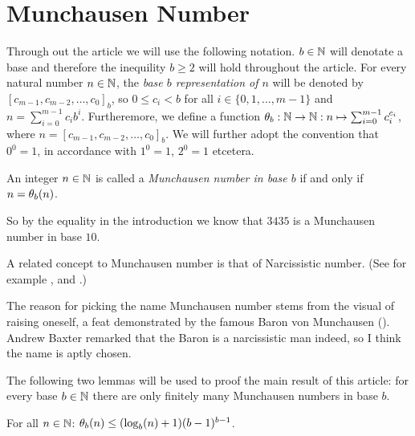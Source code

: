 \section*{Munchausen Number}
Through out the article we will use the following notation. $b \in \N$ will 
denotate a base and therefore the inequility $b \ge 2$ will hold throughout the
article. For every natural number $n \in \N$, the \emph{base $b$ representation
of $n$} will be denoted by $[c_{m-1}, c_{m-2}, \ldots, c_{0}]_{b}$, 
so $0 \le c_{i} < b$ for all $i \in \{0,1,\ldots,m-1\}$ and 
$n = \sum_{i=0}^{m-1} c_{i}b^{i}$.
Furtheremore, we define a function $\P_{b} : \N \rightarrow \N : n \mapsto 
\sum_{i=0}^{m-1} c_{i}^{c_{i}}$, where $n = [c_{m-1},c_{m-2},\ldots,c_{0}]_{b}$.
We will further adopt the convention that $0^{0} = 1$, in accordance with 
$1^{0} = 1$, $2^{0} = 1$ etcetera.

\begin{definition}
	An integer $n \in \N$ is called a \emph{Munchausen number in base $b$} if 
	and only if $n = \P_{b}(n)$.
\end{definition}

So by the equality in the introduction we know that $3435$ is a Munchausen
number in base $10$. 

\begin{remark}
	A related concept to Munchausen number is that of Narcissistic number. 
	(See for example \cite{pickover}, \cite{wikipedia:narcissistic_number} and
	\cite{wolfram:narcissistic_number}.)
	
	The reason for picking the name Munchausen number stems from the visual of
	raising oneself, a feat demonstrated by the famous Baron von Munchausen 
	(\cite{wikipedia:munchausen}). Andrew Baxter remarked that the Baron is a 
	narcissistic man indeed, so I think the name is aptly chosen.
\end{remark}

The following two lemmas will be used to proof the main 
result of this article: for every base $b \in \N$ there are only finitely many 
Munchausen numbers in base $b$.

\begin{lemma}
	For all $n \in \N$: $\P_{b}(n) \le (\blog(n) + 1)(b-1)^{b-1}$.
\end{lemma}

